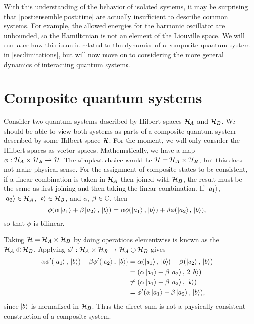 \documentclass[../thesis.tex]{subfiles}
\begin{document}
With this understanding of the behavior of isolated systems, it may be
surprising that \cref{post:ensemble,post:time} are actually
insufficient to describe common systems. For example, the allowed energies for
the harmonic oscillator are unbounded, so the Hamiltonian is not an element of
the Liouville space. We will see later how this issue is related to the dynamics
of a composite quantum system in \cref{sec:limitations}, but will now move
on to considering the more general dynamics of interacting quantum systems.

\section{Composite quantum systems\label{sec:composite}}


Consider two quantum systems described by Hilbert spaces $\mathcal{H}_A$ and
$\mathcal{H}_B$. We should be able to view both systems as parts of a composite
quantum system described by some Hilbert space $\mathcal{H}$. For the moment, we
will only consider the Hilbert spaces as vector spaces. Mathematically, we have
a map $\phi:\mathcal{H}_A \times \mathcal{H}_B \to \mathcal{H}$. The simplest choice would be
$\mathcal{H} = \mathcal{H}_A \times \mathcal{H}_B$, but this does not make physical sense. For
the assignment of composite states to be consistent, if a linear combination is
taken in $\mathcal{H}_A$ then joined with $\mathcal{H}_B$, the result must be the same as
first joining and then taking the linear combination. If $\ket{a_1}$, $\ket{a_2}
\in \mathcal{H}_A$, $\ket{b} \in \mathcal{H}_B$, and $\alpha$, $\beta \in \mathbb{C}$, then
\begin{equation}
  \phi\qty(\alpha\ket{a_1} + \beta\ket{a_2},\, \ket{b})
  = \alpha\phi\qty(\ket{a_1},\, \ket{b}) + \beta\phi\qty(\ket{a_2},\, \ket{b}),
  \label{eq:consistent-composite}
\end{equation}
so that $\phi$ is bilinear.

Taking $\mathcal{H} = \mathcal{H}_A \times \mathcal{H}_B$ by doing operations elementwise is
known as the  $\mathcal{H}_A \oplus \mathcal{H}_B$. Applying $\phi':\mathcal{H}_A
\times \mathcal{H}_B \to \mathcal{H}_A \oplus \mathcal{H}_B$ gives
\begin{align}
  \alpha\phi'\qty(\ket{a_1},\, \ket{b}) + \beta\phi'\qty(\ket{a_2},\, \ket{b})
  &= \alpha\qty(\ket{a_1},\, \ket{b}) + \beta\qty(\ket{a_2},\, \ket{b}) \\
  &= \qty(\alpha\ket{a_1} + \beta\ket{a_2},\, 2\ket{b}) \\
  &\ne \qty(\alpha\ket{a_1} + \beta\ket{a_2},\, \ket{b}) \\
  &= \phi'\qty(\alpha\ket{a_1} + \beta\ket{a_2},\, \ket{b}),
\end{align}
since $\ket{b}$ is normalized in $\mathcal{H}_B$. Thus the direct sum is not a
physically consistent construction of a composite system.
\end{document}
